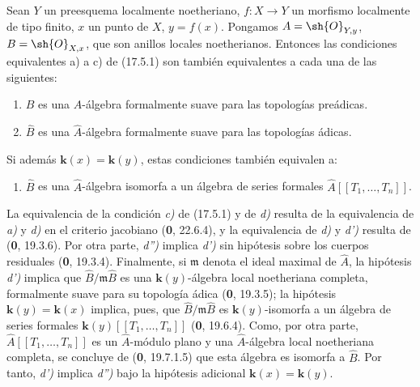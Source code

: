 \begin{proposition}[17.5.3]
\label{IV.17.5.3}
Sean $Y$ un preesquema \textup{localmente noetheriano}, $f:X\to Y$ un morfismo localmente de tipo finito, $x$ un punto de $X$, $y=f(x)$. Pongamos $A=\sh{O}_{Y,y}$, $B=\sh{O}_{X,x}$, que son anillos locales noetherianos. Entonces las condiciones equivalentes \textup{a)} a \textup{c)} de \textup{(17.5.1)} son también equivalentes a cada una de las siguientes:

\begin{enumerate}
  \item[\textup{d)}] $B$ es una $A$-álgebra formalmente suave para las topologías preádicas.
  \item[\textup{d$'$)}] $\widehat B$ es una $\widehat A$-álgebra formalmente suave para las topologías ádicas.
\end{enumerate}
Si además $\boldsymbol{k}(x)=\boldsymbol{k}(y)$, estas condiciones también equivalen a:
\begin{enumerate}
  \item[\textup{d$''$)}] $\widehat B$ es una $\widehat A$-álgebra isomorfa a un álgebra de series formales $\widehat A[[T_1,\ldots,T_n]]$.
\end{enumerate}
\end{proposition}


La equivalencia de la condición \emph{c)} de (17.5.1) y de \emph{d)} resulta de la equivalencia de \emph{a)} y \emph{d)} en el criterio jacobiano (\textbf 0, 22.6.4), y la equivalencia de \emph{d)} y \emph{d')} resulta de (\textbf 0, 19.3.6). Por otra parte, \emph{d'')} implica \emph{d')} sin hipótesis sobre los cuerpos residuales (\textbf 0, 19.3.4). Finalmente, si $\mathfrak m$ denota el ideal maximal de $\widehat A$, la hipótesis \emph{d')} implica que $\widehat B/\mathfrak m\widehat B$ es una $\boldsymbol{k}(y)$-álgebra local noetheriana completa, formalmente suave para su topología ádica (\textbf 0, 19.3.5); la hipótesis $\boldsymbol{k}(y)=\boldsymbol{k}(x)$ implica, pues, que $\widehat B/\mathfrak m\widehat B$ es $\boldsymbol{k}(y)$-isomorfa a un álgebra de series formales $\boldsymbol{k}(y)[[T_1,\ldots,T_n]]$ (\textbf 0, 19.6.4). Como, por otra parte, $\widehat A[[T_1,\ldots,T_n]]$ es un $\widehat A$-módulo plano y una $\widehat A$-álgebra local noetheriana completa, se concluye de (\textbf 0, 19.7.1.5) que esta álgebra es isomorfa a $\widehat B$. Por tanto, \emph{d')} implica \emph{d'')} bajo la hipótesis adicional $\boldsymbol{k}(x)=\boldsymbol{k}(y)$.

